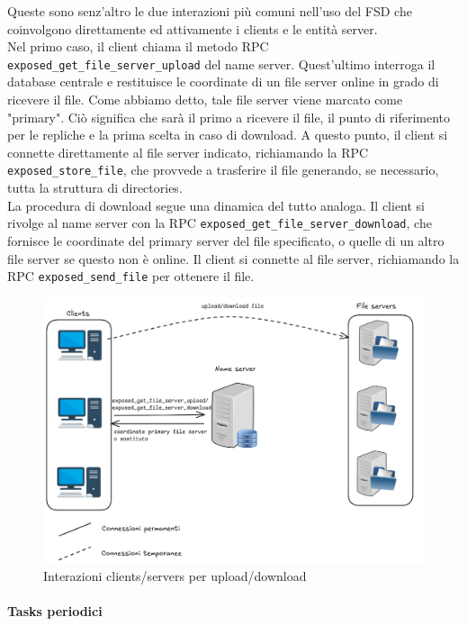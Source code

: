 \documentclass[a4paper, 12pt]{scrreprt}
\begin{document}
            Queste sono senz'altro le due interazioni più comuni nell'uso del FSD che coinvolgono direttamente ed attivamente i clients e le entità server.\\
            Nel primo caso, il client chiama il metodo RPC \texttt{exposed\_get\_file\_server\_upload} del name server. Quest'ultimo interroga il database centrale e restituisce le coordinate di un file  server online in grado di ricevere il file. Come abbiamo detto, tale file server viene marcato come "primary". Ciò significa che sarà il primo a ricevere il file, il punto di riferimento per le repliche e la prima scelta in caso di download. A questo punto, il client si connette direttamente al file server indicato, richiamando la RPC \texttt{exposed\_store\_file}, che provvede a trasferire il file generando, se necessario, tutta la struttura di directories.\\
            La procedura di download segue una dinamica del tutto analoga. Il client si rivolge al name server con la RPC \texttt{exposed\_get\_file\_server\_download}, che fornisce le coordinate del primary server del file specificato, o quelle di un altro file server se questo non è online. Il client si connette al file server, richiamando la RPC \texttt{exposed\_send\_file} per ottenere il file.

            \begin{figure}[H]
                \centering
                \includegraphics[width = .6 \textwidth]{img/upload_download.png}
                \caption{Interazioni clients/servers per upload/download}
            \end{figure}

        \paragraph{Tasks periodici}

\end{document}
